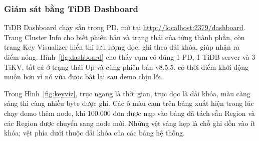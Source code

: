\subsubsection{Giám sát bằng TiDB Dashboard}

TiDB Dashboard chạy sẵn trong PD, mở tại \url{http://localhost:2379/dashboard}. Trang Cluster Info cho biết phiên bản và trạng thái của từng thành phần, còn trang Key Visualizer hiển thị lưu lượng đọc, ghi theo dải khóa, giúp nhận ra điểm nóng. Hình~\ref{fig:dashboard} cho thấy cụm có đúng 1 PD, 1 TiDB server và 3 TiKV, tất cả ở trạng thái Up và cùng phiên bản v8.5.5.  có thời điểm khởi động muộn hơn vì nó vừa được bật lại sau demo chịu lỗi.

Trong Hình~\ref{fig:keyviz}, trục ngang là thời gian, trục dọc là dải khóa, màu càng sáng thì càng nhiều byte được ghi. Các ô màu cam trên bảng  xuất hiện trong lúc chạy demo thêm node, khi 100.000 đơn được nạp vào bảng đã tách sẵn Region và các Region được chuyển sang node mới. Những vệt sáng hẹp là chỗ ghi dồn vào ít khóa; vệt phía dưới thuộc dải khóa của các bảng hệ thống.


